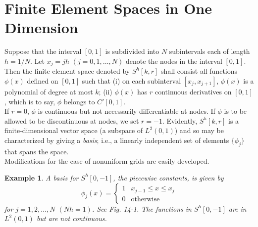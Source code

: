 \documentclass[11pt]{book}
\theoremstyle{example}
\newtheorem{example}{Example}[chapter]
\theoremstyle{problem}
\theoremstyle{theorem}
\theoremstyle{definition}
\begin{document}
\section{Finite Element Spaces in One Dimension}
Suppose that the interval $[0,1]$ is subdivided into $N$ subintervals each of length $h=1/N$. Let $x_j=jh$ $(j=0,1,\dots,N)$ denote the nodes in the interval $[0,1]$. Then the finite element space denoted by $S^h[k,r]$ shall consist all functions $\phi(x)$ defined on $[0,1]$ such that (i) on each subinterval $[x_j,x_{j+1}]$, $\phi(x)$ is a polynomial of degree at most $k$; (ii) $\phi(x)$ has $r$ continuous derivatives on $[0,1]$, which is to say, $\phi$ belongs to $C'[0,1]$.\\
If $r=0$, $\phi$ is continuous but not necessarily differentiable at nodes. If $\phi$ is to be allowed to be discontinuous at nodes, we set $r=-1$. Evidently, $S^h[k,r]$ is a finite-dimensional vector space (a subspace of $L^2(0,1)$) and so may be characterized by giving a \emph{basis}; i.e., a linearly independent set of elements $\{\phi_j\}$ that spans the space.\\
Modifications for the case of nonuniform grids are easily developed.
\begin{example}
	A basis for $S^h[0,-1]$, the \emph{piecewise constants}, is given by
	\begin{equation}
		\phi_j(x)=
		\begin{cases}
			1 & x_{j-1}{\leq}x{\leq}x_j\\
			0 & \text{otherwise}
		\end{cases}	
	\end{equation}
	for $j=1,2,\dots,N$ $(Nh=1)$. See Fig. 14-1. The functions in $S^h[0,-1]$ are in $L^2(0,1)$ but are not continuous. 
\end{example}
\end{document}
